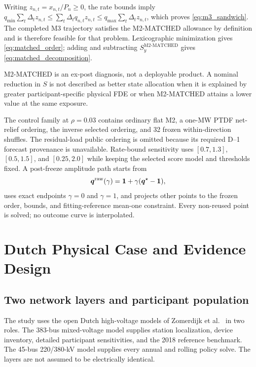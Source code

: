 \documentclass[10pt,journal]{IEEEtran}
\newcommand{\one}{\mathbf{1}}
\newcommand{\MtwoMatched}{\ensuremath{\mathrm{M2\text{-}MATCHED}}}
\begin{document}
\begin{IEEEproof}
Writing $z_{n,t}=x_{n,t}/P_n\geq0$, the rate bounds imply $q_{\min}\sum_t\Delta_tz_{n,t}\leq\sum_t\Delta_tq_{n,t}z_{n,t}\leq q_{\max}\sum_t\Delta_tz_{n,t}$, which proves \eqref{eq:m3_sandwich}. The completed M3 trajectory satisfies the M2-MATCHED allowance by definition and is therefore feasible for that problem. Lexicographic minimization gives \eqref{eq:matched_order}; adding and subtracting $S_y^{\MtwoMatched}$ gives \eqref{eq:matched_decomposition}.
\end{IEEEproof}

M2-MATCHED is an ex-post diagnosis, not a deployable product. A nominal reduction in $S$ is not described as better state allocation when it is explained by greater participant-specific physical FDE or when M2-MATCHED attains a lower value at the same exposure.

The control family at $\rho=0.03$ contains ordinary flat M2, a one-MW PTDF net-relief ordering, the inverse selected ordering, and 32 frozen within-direction shuffles. The residual-load public ordering is omitted because its required D--1 forecast provenance is unavailable. Rate-bound sensitivity uses $[0.7,1.3]$, $[0.5,1.5]$, and $[0.25,2.0]$ while keeping the selected score model and thresholds fixed. A post-freeze amplitude path starts from
\begin{equation}
\bm q^{\rm raw}(\gamma)=\one+\gamma(\bm q^\star-\one),
\label{eq:gamma}
\end{equation}
uses exact endpoints $\gamma=0$ and $\gamma=1$, and projects other points to the frozen order, bounds, and fitting-reference mean-one constraint. Every non-reused point is solved; no outcome curve is interpolated.

\section{Dutch Physical Case and Evidence Design}
\label{sec:case}

\subsection{Two network layers and participant population}

The study uses the open Dutch high-voltage models of Zomerdijk et al.\ \cite{Zomerdijk2022,ZomerdijkData} in two roles. The 383-bus mixed-voltage model supplies station localization, device inventory, detailed participant sensitivities, and the 2018 reference benchmark. The 45-bus 220/380-kV model supplies every annual and rolling policy solve. The layers are not assumed to be electrically identical.
\end{document}
